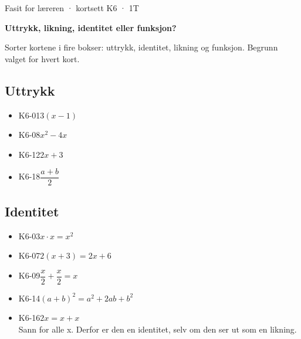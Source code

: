 \documentclass[11pt,a4paper]{article}
\begin{document}
\begin{minipage}[t]{0.8\linewidth}\vspace{0pt}
{\sffamily\small\color{dempet}Fasit for læreren · kortsett K6 · 1T}\par\vspace{0.25em}
{\fontsize{20}{24}\selectfont\bfseries Uttrykk, likning, identitet eller funksjon?}\par\vspace{0.5em}
Sorter kortene i fire bokser: uttrykk, identitet, likning og funksjon. Begrunn valget for hvert kort.\par{}
\end{minipage}\hfill
\begin{minipage}[t]{0.15\linewidth}\vspace{0pt}\raggedleft
{}
\end{minipage}\par\vspace{0.8em}

\subsection*{Uttrykk}
\begin{itemize}[leftmargin=1.2em, itemsep=0.35em]
\item \textsf{\small K6-01}\quad $3(x - 1)$
\item \textsf{\small K6-08}\quad $x^2 - 4x$
\item \textsf{\small K6-12}\quad $2x + 3$
\item \textsf{\small K6-18}\quad $\dfrac{a + b}{2}$
\end{itemize}
\subsection*{Identitet}
\begin{itemize}[leftmargin=1.2em, itemsep=0.35em]
\item \textsf{\small K6-03}\quad $x \cdot x = x^2$
\item \textsf{\small K6-07}\quad $2(x + 3) = 2x + 6$
\item \textsf{\small K6-09}\quad $\dfrac{x}{2} + \dfrac{x}{2} = x$
\item \textsf{\small K6-14}\quad $(a + b)^2 = a^2 + 2ab + b^2$
\item \textsf{\small K6-16}\quad $2x = x + x$\\{\small\color{dempet}Sann for alle x. Derfor er den en identitet, selv om den ser ut som en likning.}
\end{itemize}
\end{document}
